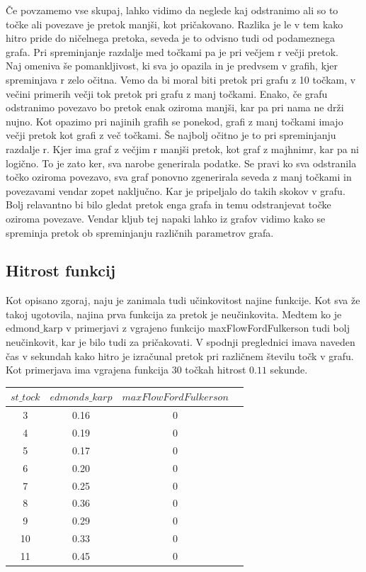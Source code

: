 \documentclass[a4paper]{article}
\begin{document}
Če povzamemo vse skupaj, lahko vidimo da neglede kaj odstranimo ali so to točke ali povezave je pretok manjši, kot pričakovano. Razlika je le v tem kako hitro pride do ničelnega pretoka, seveda je to odvisno tudi od podameznega grafa. Pri spreminjanje razdalje med točkami pa je pri večjem r večji pretok. \\


Naj omeniva še pomankljivost, ki sva jo opazila in je predvsem v grafih, kjer spreminjava r zelo očitna. Vemo da bi moral biti pretok pri grafu z 10 točkam, v večini primerih večji tok pretok pri grafu z manj točkami. Enako, če grafu odstranimo povezavo bo pretok enak oziroma manjši, kar pa pri nama ne drži nujno.  Kot opazimo pri najinih grafih se ponekod, grafi z manj točkami imajo večji pretok kot grafi z več točkami. Še najbolj očitno je to pri spreminjanju razdalje r. Kjer ima graf z večjim r manjši pretok, kot graf z majhnimr, kar pa ni logično. To je zato ker, sva narobe generirala podatke. Se pravi ko sva odstranila točko oziroma povezavo, sva graf ponovno zgenerirala seveda z manj točkami in povezavami vendar zopet naključno. Kar je pripeljalo do takih skokov v grafu. Bolj relavantno bi bilo gledat pretok enga grafa in temu odstranjevat točke oziroma povezave. Vendar kljub tej napaki lahko iz grafov vidimo kako se spreminja pretok ob spreminjanju različnih parametrov grafa. 

\subsection{Hitrost funkcij}

Kot opisano zgoraj, naju je zanimala tudi učinkovitost najine funkcije. Kot sva že takoj ugotovila, najina prva funkcija za pretok je neučinkovita.  Medtem ko je $\text{edmond\_karp}$ v primerjavi z vgrajeno funkcijo maxFlowFordFulkerson tudi bolj neučinkovit, kar je bilo tudi za pričakovati. V spodnji preglednici imava naveden čas v sekundah kako hitro je izračunal pretok pri različnem številu točk v grafu. Kot primerjava ima vgrajena funkcija 30  točkah hitrost $0.11$ sekunde. 
\begin{center}
\begin{tabular}{ |c|c|c|c| } 
\hline
$st\_tock$ & $edmonds\_karp$ & $maxFlowFordFulkerson$ \\
\hline
3 & 0.16 & 0 \\ 
4 & 0.19 & 0 \\ 
5 & 0.17 & 0 \\ 
6 & 0.20 & 0 \\ 
7 & 0.25 & 0 \\ 
8 & 0.36 & 0 \\ 
9 & 0.29 & 0 \\ 
10 & 0.33 & 0 \\ 
11 & 0.45 & 0 \\ 
\hline
\end{tabular}
\end{center}
\end{document}
